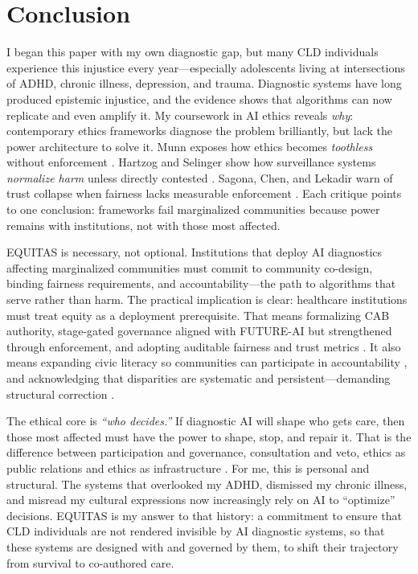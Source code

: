 \documentclass[12pt,a4paper]{article}
\begin{document}
\newpage
\section{Conclusion}
I began this paper with my own diagnostic gap, but many CLD individuals experience this injustice every year—especially adolescents living at intersections of ADHD, chronic illness, depression, and trauma. Diagnostic systems have long produced epistemic injustice, and the evidence shows that algorithms can now replicate and even amplify it. My coursework in AI ethics reveals \textit{why}: contemporary ethics frameworks diagnose the problem brilliantly, but lack the power architecture to solve it. Munn exposes how ethics becomes \textit{toothless} without enforcement \citep{Munn2023}. Hartzog and Selinger show how surveillance systems \textit{normalize harm} unless directly contested \citep{Selinger2018}. Sagona, Chen, and Lekadir warn of trust collapse when fairness lacks measurable enforcement \citep{Sagona2025, Chen2023, Lekadir2025}. Each critique points to one conclusion: frameworks fail marginalized communities because power remains with institutions, not with those most affected.

\vspace{0.5em}
EQUITAS is necessary, not optional. Institutions that deploy AI diagnostics affecting marginalized communities must commit to community co-design, binding fairness requirements, and accountability—the path to algorithms that serve rather than harm. The practical implication is clear: healthcare institutions must treat equity as a deployment prerequisite. That means formalizing CAB authority, stage-gated governance aligned with FUTURE-AI but strengthened through enforcement, and adopting auditable fairness and trust metrics \citep{Lekadir2025, Chen2023, Sagona2025}. It also means expanding civic literacy so communities can participate in accountability \citep{GarciaBautista2025RMP}, and acknowledging that disparities are systematic and persistent—demanding structural correction \citep{Marko2025}.

\vspace{0.5em}
The ethical core is \textit{``who decides.''} If diagnostic AI will shape who gets care, then those most affected must have the power to shape, stop, and repair it. That is the difference between participation and governance, consultation and veto, ethics as public relations and ethics as infrastructure \citep{Munn2023}. For me, this is personal and structural. The systems that overlooked my ADHD, dismissed my chronic illness, and misread my cultural expressions now increasingly rely on AI to “optimize” decisions. EQUITAS is my answer to that history: a commitment to ensure that CLD individuals are not rendered invisible by AI diagnostic systems, so that these systems are designed with and governed by them, to shift their trajectory from survival to co-authored care.
\end{document}

